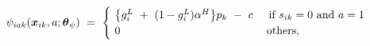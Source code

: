 \begin{equation}
\begin{split}
    \psi_{iak}(\boldsymbol{x}_{ik}, a; \boldsymbol{\theta}_{\psi}) \
    & = \ 
    \begin{cases}
        \ \big\{ g_{i}^{L} \ + \ (1 - g_{i}^{L}) \alpha^{H} \big\} p_{k} \ - \ c \hspace{0.5cm} \text{if $s_{ik} = 0$ and $a = 1$} \\
        \ 0 \hspace{4.65cm} \text{others},
    \end{cases}
\end{split}
\label{Equation:Firms-Problem_Instantaneous-Payoff}
\end{equation}